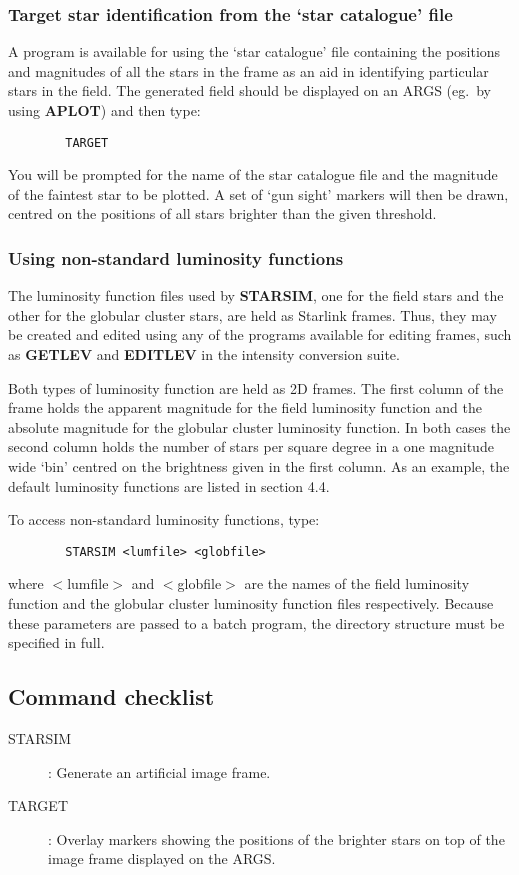 \subsubsection {Target star identification from the `star catalogue' file}
A program is available for using the `star catalogue' file containing the
positions and magnitudes of all the stars in the frame as an aid in identifying
particular stars in the field.
The generated field should be displayed on an ARGS (eg.\ by using {\bf APLOT})
and then type:
\begin{verbatim}
        TARGET
\end{verbatim}
You will be prompted for the name of the star catalogue file and the magnitude
of the faintest star to be plotted.
A set of `gun sight' markers will then be drawn, centred on the positions of all
stars brighter than the given threshold.
\subsubsection {Using non-standard luminosity functions}
The luminosity function files used by {\bf STARSIM}, one for the field stars and
the other for the globular cluster stars, are held as Starlink frames.
Thus, they may be created and edited using any of the programs available for
editing frames, such as {\bf GETLEV} and {\bf EDITLEV} in the intensity
conversion suite.

Both types of luminosity function are held as 2D frames.
The first column of the frame holds the apparent magnitude for the field
luminosity function and the absolute magnitude for the globular cluster
luminosity function.
In both cases the second column holds the number of stars per square degree in
a one magnitude wide `bin' centred on the brightness given in the first column.
As an example, the default luminosity functions are listed in section 4.4.

To access non-standard luminosity functions, type:
\begin{verbatim}
        STARSIM <lumfile> <globfile>
\end{verbatim}
where $<$lumfile$>$ and $<$globfile$>$ are the names of the field luminosity function
and the globular cluster luminosity function files respectively.
Because these parameters are passed to a batch program, the directory structure
must be specified in full.
\subsection {Command checklist}
\begin{description}
\begin{description}
\item [STARSIM]: Generate an artificial image frame.
\item [TARGET]: Overlay markers showing the positions of the brighter stars on
top of the image frame displayed on the ARGS.
\end{description}
\end{description}
